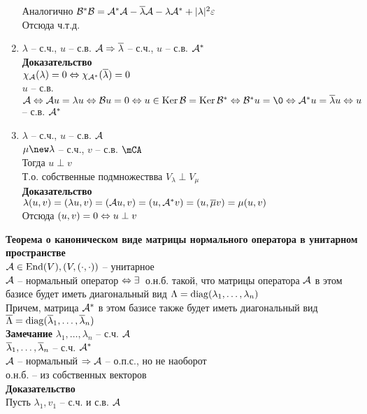 \documentclass[12pt]{article}
\begin{document}
\begin{enumerate}
        Аналогично $\mathcal{B}^*\mathcal{B} = \mathcal{A}^*\mathcal{A} - \overline \lambda\mathcal{A} - \lambda\mathcal{A}^*  + | \lambda|^2\varepsilon $\\
        Отсюда ч.т.д.
    \item $ \lambda $ -- с.ч., $u$ -- с.в. $\mathcal{A} \Rightarrow \overline \lambda$ -- с.ч., $u$ -- с.в. $\mathcal{A}^*$\\
        \textbf{Доказательство}\\
        $\chi_\mathcal{A}( \lambda) = 0 \Leftrightarrow \chi_{\mathcal{A}^*}(\overline \lambda) = 0 $\\
        $u$ -- с.в. $\mcA \LRto \mcA u = \lambda u \LRto \mcB u = 0 \LRto u \in \ker \mcB = \ker \mcB^* \LRto \mcB^*u = \0 \LRto \mcA^* u = \ol \lambda u \LRto u$ -- с.в. $\mathcal{A}^*$
    \item $ \lambda$ -- с.ч., $u$ -- с.в. $\mathcal{A}$\\
        $ \mu \new \lambda$ -- с.ч., $v$ -- с.в. $\mCA$\\
        Тогда $u \perp v$\\
        Т.о. собственные подмножествва $V_ \lambda \perp V_ \mu$\\
        \textbf{Доказательство}\\
        $ \lambda(u, v) = ( \lambda u, v) = (\mathcal{A} u, v) = (u, \mathcal{A}^* v) = (u, \overline \mu v) = \mu(u, v)$\\
        Отсюда $(u, v) = 0 \Leftrightarrow u \perp v$
\end{enumerate}
\textbf{Теорема о каноническом виде матрицы нормального оператора в унитарном пространстве}\\
$\mathcal{A} \in \operatorname{End}(V), (V, (\cdot, \cdot))$ -- унитарное\\
$\mathcal{A}$ -- нормальный оператор $\Leftrightarrow \exists\,$ о.н.б. такой, что матрицы оператора $\mathcal{A}$ в этом базисе будет иметь диагональный вид $ \Lambda = \operatorname{diag}( \lambda_1, \ldots, \lambda_n)$\\
Причем, матрица $\mathcal{A}^*$ в этом базисе также будет иметь диагональный вид $\overline{ \Lambda} = \operatorname{diag}(\overline \lambda_1, \ldots, \overline \lambda_n)$\\
\textbf{Замечание}
$ \lambda_1, \ldots, \lambda_n$ -- с.ч. $\mathcal{A}$\\
    $\overline \lambda_1, \ldots, \overline \lambda_n$ -- с.ч. $\mathcal{A}^*$\\
    $\mathcal{A}$ -- нормальный $\Rightarrow \mathcal{A}$ -- о.п.с., но не наоборот\\
    о.н.б. -- из собственных векторов\\
    \textbf{Доказательство}\\
    Пусть $ \lambda_1, v_1$ -- с.ч. и с.в. $\mathcal{A}$\\
\end{document}
